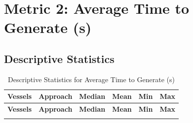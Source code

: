 \documentclass[10pt,a4paper]{article}
\begin{document}
\section{Metric 2: Average Time to Generate (s)}

\subsection{Descriptive Statistics}

\begin{longtable}{c l c c c c}
\caption{Descriptive Statistics for Average Time to Generate (s)} \\
\toprule
\textbf{Vessels} & \textbf{Approach} & \textbf{Median} & \textbf{Mean} & \textbf{Min} & \textbf{Max} \\
\midrule
\endfirsthead
\toprule
\textbf{Vessels} & \textbf{Approach} & \textbf{Median} & \textbf{Mean} & \textbf{Min} & \textbf{Max} \\
\midrule
\endhead
\bottomrule
\endfoot


\end{longtable}
\end{document}
